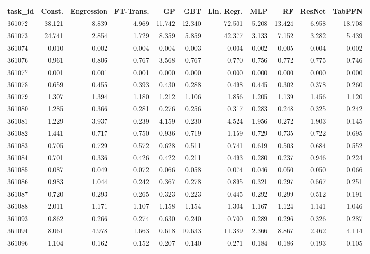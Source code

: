 \begin{tabular}{lrrrrrrrrrr}
\toprule
task\_id & Const. & Engression & FT-Trans. & GP & GBT & Lin. Regr. & MLP & RF & ResNet & TabPFN \\
\midrule
361072 & 38.121 & 8.839 & 4.969 & 11.742 & 12.340 & 72.501 & 5.208 & 13.424 & 6.958 & 18.708 \\
361073 & 24.741 & 2.854 & 1.729 & 8.359 & 5.859 & 42.377 & 3.133 & 7.152 & 3.282 & 5.439 \\
361074 & 0.010 & 0.002 & 0.004 & 0.004 & 0.003 & 0.004 & 0.002 & 0.005 & 0.004 & 0.002 \\
361076 & 0.961 & 0.806 & 0.767 & 3.568 & 0.767 & 0.770 & 0.756 & 0.772 & 0.775 & 0.746 \\
361077 & 0.001 & 0.001 & 0.001 & 0.000 & 0.000 & 0.000 & 0.000 & 0.000 & 0.000 & 0.000 \\
361078 & 0.659 & 0.455 & 0.393 & 0.430 & 0.288 & 0.498 & 0.445 & 0.302 & 0.378 & 0.260 \\
361079 & 1.307 & 1.394 & 1.180 & 1.212 & 1.106 & 1.856 & 1.205 & 1.139 & 1.456 & 1.120 \\
361080 & 1.285 & 0.366 & 0.281 & 0.276 & 0.256 & 0.317 & 0.283 & 0.248 & 0.325 & 0.242 \\
361081 & 1.229 & 3.937 & 0.239 & 4.159 & 0.230 & 4.524 & 1.956 & 0.272 & 1.903 & 0.145 \\
361082 & 1.441 & 0.717 & 0.750 & 0.936 & 0.719 & 1.159 & 0.729 & 0.735 & 0.722 & 0.695 \\
361083 & 0.705 & 0.729 & 0.572 & 0.628 & 0.511 & 0.741 & 0.619 & 0.503 & 0.684 & 0.552 \\
361084 & 0.701 & 0.336 & 0.426 & 0.422 & 0.211 & 0.493 & 0.280 & 0.237 & 0.946 & 0.224 \\
361085 & 0.087 & 0.049 & 0.072 & 0.066 & 0.058 & 0.074 & 0.046 & 0.050 & 0.050 & 0.066 \\
361086 & 0.983 & 1.044 & 0.242 & 0.367 & 0.278 & 0.895 & 0.321 & 0.297 & 0.567 & 0.251 \\
361087 & 0.720 & 0.293 & 0.265 & 0.323 & 0.223 & 0.445 & 0.292 & 0.299 & 0.512 & 0.191 \\
361088 & 2.011 & 1.171 & 1.107 & 1.158 & 1.154 & 1.304 & 1.167 & 1.124 & 1.141 & 1.046 \\
361093 & 0.862 & 0.266 & 0.274 & 0.630 & 0.240 & 0.700 & 0.289 & 0.296 & 0.326 & 0.287 \\
361094 & 8.061 & 4.978 & 1.663 & 0.618 & 10.633 & 11.389 & 2.366 & 8.867 & 2.462 & 4.114 \\
361096 & 1.104 & 0.162 & 0.152 & 0.207 & 0.140 & 0.271 & 0.184 & 0.186 & 0.193 & 0.105 \\

\end{tabular}
